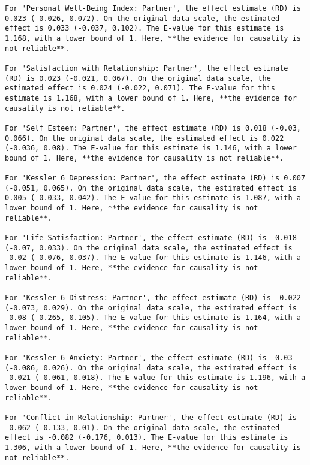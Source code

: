 \documentclass[
  singlecolumn]{article}
\begin{document}
\newpage{}

\begin{verbatim}
For 'Personal Well-Being Index: Partner', the effect estimate (RD) is 0.023 (-0.026, 0.072). On the original data scale, the estimated effect is 0.033 (-0.037, 0.102). The E-value for this estimate is 1.168, with a lower bound of 1. Here, **the evidence for causality is not reliable**.

For 'Satisfaction with Relationship: Partner', the effect estimate (RD) is 0.023 (-0.021, 0.067). On the original data scale, the estimated effect is 0.024 (-0.022, 0.071). The E-value for this estimate is 1.168, with a lower bound of 1. Here, **the evidence for causality is not reliable**.

For 'Self Esteem: Partner', the effect estimate (RD) is 0.018 (-0.03, 0.066). On the original data scale, the estimated effect is 0.022 (-0.036, 0.08). The E-value for this estimate is 1.146, with a lower bound of 1. Here, **the evidence for causality is not reliable**.

For 'Kessler 6 Depression: Partner', the effect estimate (RD) is 0.007 (-0.051, 0.065). On the original data scale, the estimated effect is 0.005 (-0.033, 0.042). The E-value for this estimate is 1.087, with a lower bound of 1. Here, **the evidence for causality is not reliable**.

For 'Life Satisfaction: Partner', the effect estimate (RD) is -0.018 (-0.07, 0.033). On the original data scale, the estimated effect is -0.02 (-0.076, 0.037). The E-value for this estimate is 1.146, with a lower bound of 1. Here, **the evidence for causality is not reliable**.

For 'Kessler 6 Distress: Partner', the effect estimate (RD) is -0.022 (-0.073, 0.029). On the original data scale, the estimated effect is -0.08 (-0.265, 0.105). The E-value for this estimate is 1.164, with a lower bound of 1. Here, **the evidence for causality is not reliable**.

For 'Kessler 6 Anxiety: Partner', the effect estimate (RD) is -0.03 (-0.086, 0.026). On the original data scale, the estimated effect is -0.021 (-0.061, 0.018). The E-value for this estimate is 1.196, with a lower bound of 1. Here, **the evidence for causality is not reliable**.

For 'Conflict in Relationship: Partner', the effect estimate (RD) is -0.062 (-0.133, 0.01). On the original data scale, the estimated effect is -0.082 (-0.176, 0.013). The E-value for this estimate is 1.306, with a lower bound of 1. Here, **the evidence for causality is not reliable**.
\end{verbatim}
\end{document}
